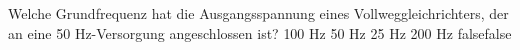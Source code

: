     {Welche Grundfrequenz hat die Ausgangsspannung eines Vollweggleichrichters, der an eine 50 Hz-Versorgung angeschlossen ist?}
    {100 Hz}
    {50 Hz}
    {25 Hz}
    {200 Hz}
    {false}{false}